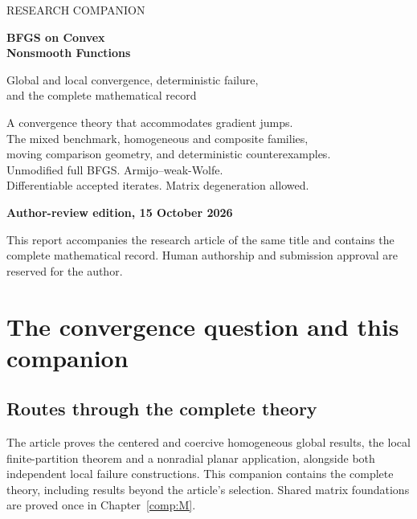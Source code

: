 

\begin{titlepage}
{\large\sffamily RESEARCH COMPANION}\par\vspace{20mm}
{\Huge\bfseries BFGS on Convex\\[3mm]Nonsmooth Functions}\par\vspace{10mm}
{\Large Global and local convergence, deterministic failure,\\[2mm]and the complete mathematical record}\par
\vspace{12mm}{\color{Accent}\rule{\textwidth}{1pt}}\par\vspace{8mm}
\begin{minipage}{.92\textwidth}\large
A convergence theory that accommodates gradient jumps.\\[5mm]
The mixed benchmark, homogeneous and composite families,\\
moving comparison geometry, and deterministic counterexamples.\\[5mm]
Unmodified full BFGS. Armijo--weak-Wolfe.\\
Differentiable accepted iterates. Matrix degeneration allowed.
\end{minipage}
\vfill
\textbf{Author-review edition, 15 October 2026}\par
This report accompanies the research article of the same title and
contains the complete mathematical record.
Human authorship and submission approval are reserved for the author.
\end{titlepage}
\frontmatter
\chapter*{The convergence question and this companion}


\section*{Routes through the complete theory}
The article proves the centered and coercive homogeneous global results,
the local finite-partition theorem and a nonradial planar application,
alongside both independent local failure constructions. This companion
contains the complete theory, including results beyond the article's
selection. Shared matrix foundations are proved once in
Chapter~\ref{comp:M}.

